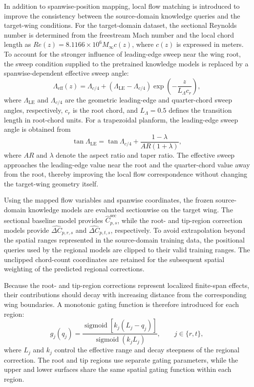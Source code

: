 In addition to spanwise-position mapping, local flow matching is introduced to improve the consistency between the source-domain knowledge queries and the target-wing conditions. For the target-domain dataset, the sectional Reynolds number is determined from the freestream Mach number and the local chord length as $Re(z)=8.1166\times10^6 M_\infty c(z)$, where $c(z)$ is expressed in meters. To account for the stronger influence of leading-edge sweep near the wing root, the sweep condition supplied to the pretrained knowledge models is replaced by a spanwise-dependent effective sweep angle:
\begin{equation}
\Lambda_{\mathrm{eff}}(z)
=
\Lambda_{c/4}
+
\left(\Lambda_{\mathrm{LE}}-\Lambda_{c/4}\right)
\exp\left(-\frac{z}{L_{\Lambda}c_r}\right),
\label{eq:effective-sweep-mapping}
\end{equation}
where $\Lambda_{\mathrm{LE}}$ and $\Lambda_{c/4}$ are the geometric leading-edge and quarter-chord sweep angles, respectively, $c_r$ is the root chord, and $L_{\Lambda}=0.5$ defines the transition length in root-chord units. For a trapezoidal planform, the leading-edge sweep angle is obtained from
\[
\tan\Lambda_{\mathrm{LE}}
=
\tan\Lambda_{c/4}
+
\frac{1-\lambda}{AR(1+\lambda)},
\]
where $AR$ and $\lambda$ denote the aspect ratio and taper ratio. The effective sweep approaches the leading-edge value near the root and the quarter-chord value away from the root, thereby improving the local flow correspondence without changing the target-wing geometry itself.

Using the mapped flow variables and spanwise coordinates, the frozen source-domain knowledge models are evaluated sectionwise on the target wing. The sectional baseline model provides $\widehat{C}_{p,s}^{\mathrm{sec}}$, while the root- and tip-region correction models provide $\widehat{\Delta C}_{p,r,s}$ and $\widehat{\Delta C}_{p,t,s}$, respectively. To avoid extrapolation beyond the spatial ranges represented in the source-domain training data, the positional queries used by the regional models are clipped to their valid training ranges. The unclipped chord-count coordinates are retained for the subsequent spatial weighting of the predicted regional corrections.

Because the root- and tip-region corrections represent localized finite-span effects, their contributions should decay with increasing distance from the corresponding wing boundaries. A monotonic gating function is therefore introduced for each region:
\begin{equation}
g_j(q_j)
=
\frac{
\operatorname{sigmoid}\left[k_j(L_j-q_j)\right]
}{
\operatorname{sigmoid}(k_jL_j)
},
\qquad j\in\{r,t\},
\label{eq:regional-gating}
\end{equation}
where $L_j$ and $k_j$ control the effective range and decay steepness of the regional correction. The root and tip regions use separate gating parameters, while the upper and lower surfaces share the same spatial gating function within each region.

